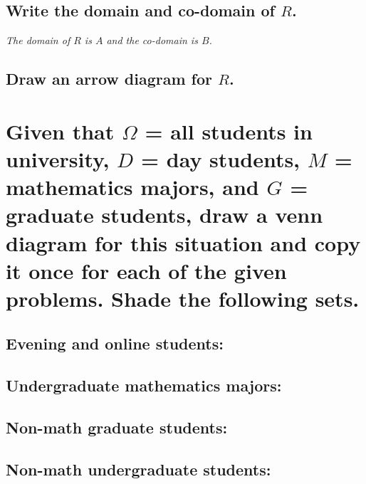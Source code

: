 \documentclass{article}
\begin{document}
\subsection{Write the domain and co-domain of $R$.}
\hspace{1cm}\textit{The domain of $R$ is $A$ and the co-domain is $B$.}
\subsection{Draw an arrow diagram for $R$.}
\begin{center}
\end{center}
\clearpage


\section{Given that $\Omega$ = all students in university, $D$ = day students,
    $M$ = mathematics majors, and $G$ = graduate students, draw a venn diagram for
    this situation and copy it once for each of the given problems. Shade the
    following sets.}
\subsection{Evening and online students:}
\begin{center}
\end{center}
\subsection{Undergraduate mathematics majors:}
\subsection{Non-math graduate students:}
\subsection{Non-math undergraduate students:}
\end{document}
